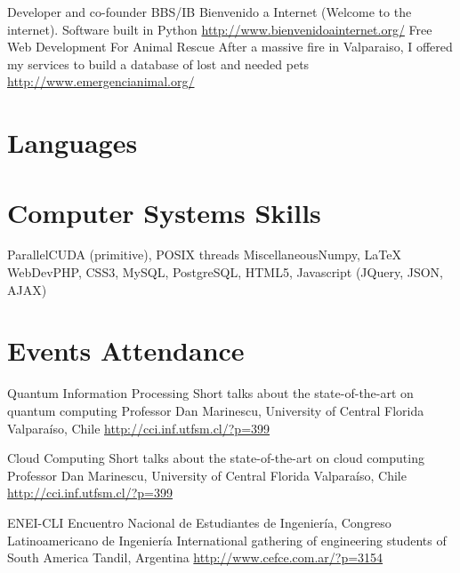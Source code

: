 \documentclass[11pt,a4paper,sans]{moderncv}
\begin{document}
        {Developer and co-founder}
        {BBS/IB Bienvenido a Internet (Welcome to the internet). Software built in Python}
        {}
        {}
        {\url{http://www.bienvenidoainternet.org/}}
        {Free Web Development For Animal Rescue}
        {After a massive fire in Valparaiso, I offered my services to build a database of lost and needed pets}
        {}
        {}
        {\url{http://www.emergencianimal.org/}}
        
\section{Languages}

\section{Computer Systems Skills}
           {Parallel}{CUDA (primitive), POSIX threads}
           {Miscellaneous}{Numpy, \LaTeX}
           {WebDev}{PHP, CSS3, MySQL, PostgreSQL, HTML5, Javascript (JQuery, JSON, AJAX)}

\section{Events Attendance}

        {Quantum Information Processing}
        {Short talks about the state-of-the-art on quantum computing}
        {Professor Dan Marinescu, University of Central Florida}
        {Valparaíso, Chile}
        {\url{http://cci.inf.utfsm.cl/?p=399}}
        
        {Cloud Computing}
        {Short talks about the state-of-the-art on cloud computing}
        {Professor Dan Marinescu, University of Central Florida}
        {Valparaíso, Chile}
        {\url{http://cci.inf.utfsm.cl/?p=399}}

        {ENEI-CLI}
        {Encuentro Nacional de Estudiantes de Ingeniería, Congreso Latinoamericano de Ingeniería}
        {International gathering of engineering students of South America}
        {Tandil, Argentina \url{http://www.cefce.com.ar/?p=3154}}
        {}
\end{document}

